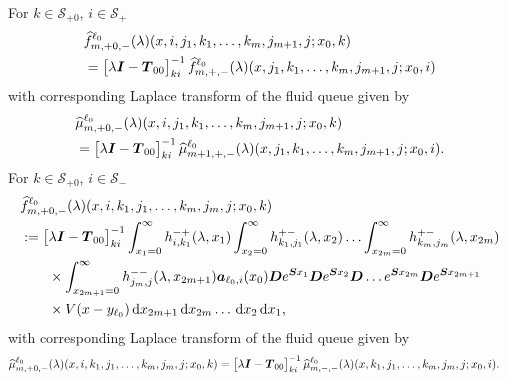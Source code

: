 For \(k\in\mathcal S_{+0}\), \(i\in\mathcal S_+\)
\begin{align}
		&\widehat{f}_{m,+0,-}^{\ell_0}(\lambda)(x,i,j_1,k_1,\dots,k_m,j_{m+1},j;x_0,k) \nonumber 
		\\&=\vligne{\lambda \bs I - \bs T_{00}}^{-1}_{ki}\widehat{f}_{m,+,-}^{\ell_0}(\lambda)(x,j_1,k_1,\dots,k_m,j_{m+1},j;x_0,i)
		\label{eqn: k0jJ0asfcavv134}%
\end{align} 
with corresponding Laplace transform of the fluid queue given by 
\begin{align}
		&\widehat{\mu}_{m,+0,-}^{\ell_0}(\lambda)(x,i,j_1,k_1,\dots,k_m,j_{m+1},j;x_0,k) \nonumber 
		\\&=\begin{bmatrix} \lambda \boldsymbol I - \boldsymbol T_{00} \end{bmatrix}^{-1}_{ki}\widehat{\mu}_{m+1,+,-}^{\ell_0}(\lambda)(x,j_1,k_1,\dots,k_m,j_{m+1},j;x_0,i).
		\label{eqn: k0jJ0asfcavv134asdga}
\end{align} 
For \(k\in\mathcal S_{+0}\), \(i\in\mathcal S_-\)
\begin{align}
	&\widehat{f}_{m,+0,-}^{\ell_0}(\lambda)(x,i,k_1,j_1,\dots,k_{m},j_{m},j;x_0,k)\nonumber 
	\\&:=\begin{bmatrix} \lambda \boldsymbol I - \boldsymbol T_{00} \end{bmatrix}^{-1}_{ki}\int_{x_1=0}^\infty h^{-+}_{i,k_{1}}(\lambda,x_1)\nonumber
	\int_{x_2=0}^\infty h^{+-}_{k_1,j_1}(\lambda,x_2)
	\hdots \int_{x_{2m}=0}^\infty h^{+-}_{k_{m},j_{m}}(\lambda, x_{2m}) 
	\\&\qquad \times\int_{x_{2m+1}=0}^\infty h^{--}_{j_{m},j}(\lambda,x_{2m+1})
	 \boldsymbol   a_{\ell_0,i}(x_0)\boldsymbol De^{\boldsymbol{S}x_1} \boldsymbol{D} e^{\boldsymbol{S}x_2} \boldsymbol{D}\dots e^{\boldsymbol{S}x_{2m}}  \boldsymbol{D}e^{\boldsymbol{S}x_{2m+1}} \nonumber 
	 \\&\qquad{}\times V(x-y_{\ell_0})  \, \mathrm{d} x_{2m+1} \, \mathrm{d} x_{2m}\dots\, \mathrm{d} x_2 \, \mathrm{d} x_1,\label{eqn: kvv0jJ0AfAAaAA}
\end{align}
with corresponding Laplace transform of the fluid queue given by 
\begin{align}
		&\widehat{\mu}_{m,+0,-}^{\ell_0}(\lambda)(x,i,k_1,j_1,\dots,k_{m},j_{m},j;x_0,k) \nonumber 
		=\begin{bmatrix} \lambda \boldsymbol I - \boldsymbol T_{00} \end{bmatrix}^{-1}_{ki}\widehat{\mu}_{m,-,-}^{\ell_0}(\lambda)(x,k_1,j_1,\dots,k_{m},j_{m},j;x_0,i).
\end{align}  

